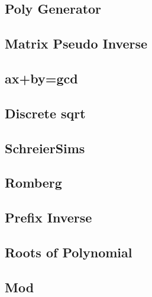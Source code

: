 \documentclass[a4paper,10pt,twocolumn,oneside]{article}
\begin{document}
\subsection{Poly Generator}


\subsection{Matrix Pseudo Inverse}


\subsection{ax+by=gcd}


\subsection{Discrete sqrt}


\subsection{SchreierSims}


\subsection{Romberg}


%

\subsection{Prefix Inverse}


\subsection{Roots of Polynomial}


\subsection{Mod}

\end{document}
